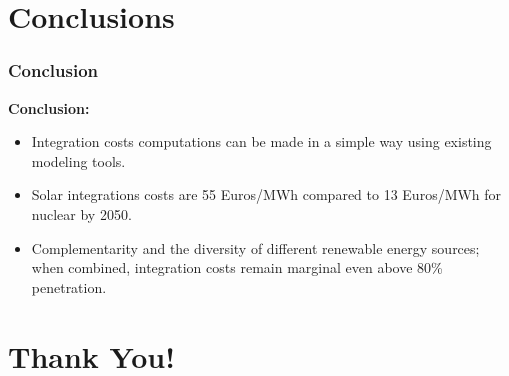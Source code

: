 \documentclass[aspectratio=169]{beamer}
\begin{document}
\section{Conclusions}

\begin{frame}[fragile]
  \frametitle{Conclusion}

  \textbf{Conclusion:}
    \begin{itemize}
      \item {Integration costs computations can be made in a simple way using existing modeling tools.}
      \item {Solar integrations costs are 55 Euros/MWh compared to 13 Euros/MWh for nuclear by 2050.}
      \item {Complementarity and the diversity of different renewable energy sources; when combined, integration costs remain marginal even above 80\% penetration.}
    \end{itemize}

\end{frame}




\section{Thank You!}
\end{document}
